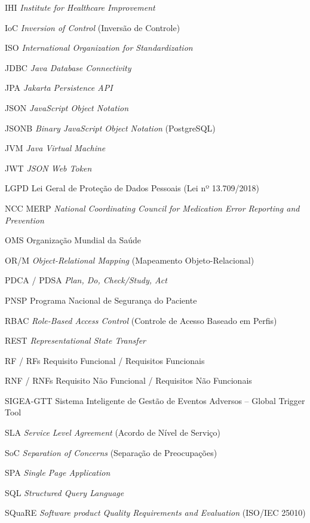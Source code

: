 \begin{siglas}
  \item[IHI] \textit{Institute for Healthcare Improvement}
  \item[IoC] \textit{Inversion of Control} (Inversão de Controle)
  \item[ISO] \textit{International Organization for Standardization}
  \item[JDBC] \textit{Java Database Connectivity}
  \item[JPA] \textit{Jakarta Persistence API}
  \item[JSON] \textit{JavaScript Object Notation}
  \item[JSONB] \textit{Binary JavaScript Object Notation} (PostgreSQL)
  \item[JVM] \textit{Java Virtual Machine}
  \item[JWT] \textit{JSON Web Token}
  \item[LGPD] Lei Geral de Proteção de Dados Pessoais (Lei nº 13.709/2018)
  \item[NCC MERP] \textit{National Coordinating Council for Medication Error Reporting and Prevention}
  \item[OMS] Organização Mundial da Saúde
  \item[OR/M] \textit{Object-Relational Mapping} (Mapeamento Objeto-Relacional)
  \item[PDCA / PDSA] \textit{Plan, Do, Check/Study, Act}
  \item[PNSP] Programa Nacional de Segurança do Paciente
  \item[RBAC] \textit{Role-Based Access Control} (Controle de Acesso Baseado em Perfis)
  \item[REST] \textit{Representational State Transfer}
  \item[RF / RFs] Requisito Funcional / Requisitos Funcionais
  \item[RNF / RNFs] Requisito Não Funcional / Requisitos Não Funcionais
  \item[SIGEA-GTT] Sistema Inteligente de Gestão de Eventos Adversos – Global Trigger Tool
  \item[SLA] \textit{Service Level Agreement} (Acordo de Nível de Serviço)
  \item[SoC] \textit{Separation of Concerns} (Separação de Preocupações)
  \item[SPA] \textit{Single Page Application}
  \item[SQL] \textit{Structured Query Language}
  \item[SQuaRE] \textit{Software product Quality Requirements and Evaluation} (ISO/IEC 25010)

\end{siglas}
